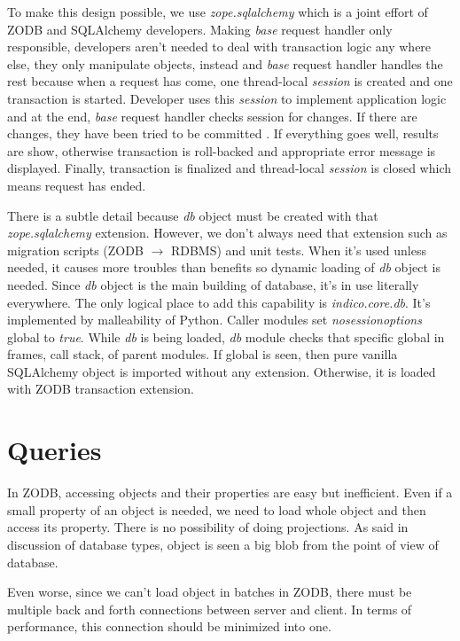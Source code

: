 To make this design possible, we use \textit{zope.sqlalchemy} which is a joint effort of ZODB and SQLAlchemy developers. Making \textit{base} request handler only responsible, developers aren't needed to deal with transaction logic any where else, they only manipulate objects, instead and \textit{base} request handler handles the rest because when a request has come, one thread-local \textit{session} is created and one transaction is started. Developer uses this \textit{session} to implement application logic and at the end, \textit{base} request handler checks session for changes. If there are changes, they have been tried to be committed  . If everything goes well, results are show, otherwise transaction is roll-backed and appropriate error message is displayed. Finally, transaction is finalized and  thread-local \textit{session} is closed which means request has ended.

There is a subtle detail because \textit{db} object must be created with that \textit{zope.sqlalchemy} extension. However, we don't always need that extension such as migration scripts (ZODB $\rightarrow$ RDBMS) and unit tests. When it's used unless needed, it causes more troubles than benefits so dynamic loading of \textit{db} object is needed. Since \textit{db} object is the main building of database, it's in use literally everywhere. The only logical place to add this capability is \textit{indico.core.db}. It's implemented by malleability of Python. Caller modules set \textunderscore \textunderscore \textit{no}\textunderscore \textit{session}\textunderscore \textit{options}\textunderscore\textunderscore\textit{ }global to \textit{true}. While \textit{db} is being loaded, \textit{db} module checks that specific global in frames, call stack, of parent modules. If global is seen, then pure vanilla SQLAlchemy object is imported without any extension. Otherwise, it is loaded with ZODB transaction extension.

\section{Queries}

In ZODB, accessing objects and their properties are easy but inefficient. Even if a small property of an object is needed, we need to load whole object and then access its property. There is no possibility of doing projections. As said in discussion of database types, object is seen a big blob from the point of view of database.

Even worse, since we can't load object in batches in ZODB, there must be multiple back and forth connections between server and client. In terms of performance, this connection should be minimized into one.

